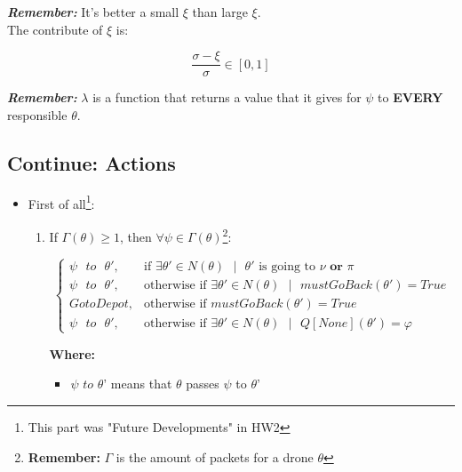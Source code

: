 \documentclass[12pt]{article}
\begin{document}
\textit{\textbf{Remember:}} It's better a small $\xi$ than large $\xi$. \\

The contribute of $\xi$ is: 

\[
    \frac{\sigma - \xi}{\sigma} \in [0,1]
\]


\textit{\textbf{Remember:}} $\lambda$ is a function that returns a value that it gives for $\psi$ to \textbf{EVERY} responsible $\theta$.

\subsection{Continue: Actions}
\label{subsection:Continue_Actions}

\begin{itemize}

    \item First of all\footnote{This part was "Future Developments" in HW2}:
    
    \begin{enumerate}
    
        \item If $\Gamma(\theta) \geq 1$, then $\forall \psi \in \Gamma(\theta)$\footnote{\textbf{Remember:} $\Gamma$ is the amount of packets for a drone $\theta$}:
    
        
        
        \[
            \begin{cases}
                \psi \text{ } to \text{ } \theta',& \text{if } \exists\theta' \in N( \theta ) \text{ } | \text{ }\theta' \text{ is going to } \nu \textbf{ or } \pi\\
                \psi \text{ } to \text{ } \theta',& \text{otherwise if } \exists\theta' \in N(\theta) \text{ } | \text{ }mustGoBack(\theta') = True \\
               	Go to Depot, & \text{otherwise if }mustGoBack (\theta') = True \\
                \psi \text{ } to \text{ } \theta',& \text{otherwise if }\exists\theta' \in N(\theta) \text{ } | \text{ } Q[None](\theta') = \varphi
            \end{cases}
        \]
    
        
        \textbf{Where:}
        
        \begin{itemize}
        
            \item $\psi$ $to$ $\theta$' means that $\theta$ passes $\psi$ to $\theta$'
            

\end{itemize}
\end{enumerate}
\end{itemize}
\end{document}
